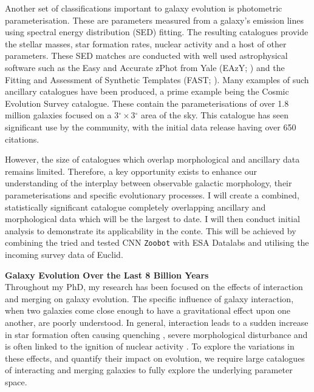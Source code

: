 \documentclass[11pt]{article}
\begin{document}
Another set of classifications important to galaxy evolution is photometric parameterisation. These are parameters measured from a galaxy's emission lines using spectral energy distribution (SED) fitting. The resulting catalogues provide the stellar masses, star formation rates, nuclear activity and a host of other parameters. These SED matches are conducted with well used astrophysical software such as the Easy and Accurate zPhot from Yale (EAzY; \citet{2008ApJ...686.1503B}) and the Fitting and Assessment of Synthetic Templates (FAST; \citet{2009ApJ...700..221K}). Many examples of such ancillary catalogues have been produced, a prime example being the Cosmic Evolution Survey \citep[COSMOS; ][]{2007ApJS..172...99C} catalogue. These contain the parameterisations of over 1.8 million galaxies focused on a 3$^{\circ} \times $3$^{\circ}$ area of the sky. This catalogue has seen significant use by the community, with the initial data release having over 650 citations.

However, the size of catalogues which overlap morphological and ancillary data remains limited. Therefore, a key opportunity exists to enhance our understanding of the interplay between observable galactic morphology, their parameterisations and specific evolutionary processes. I will create a combined, statistically significant catalogue completely overlapping ancillary and morphological data which will be the largest to date. I will then conduct initial analysis to demonstrate its applicability in the conte. This will be achieved by combining the tried and tested CNN \texttt{Zoobot} with ESA Datalabs and utilising the incoming survey data of Euclid.

\vspace{-5mm}
\impact
\vspace{-3mm}
\noindent \textbf{Galaxy Evolution Over the Last 8 Billion Years} \\
\noindent Throughout my PhD, my research has been focused on the effects of interaction and merging on galaxy evolution. The specific influence of galaxy interaction, when two galaxies come close enough to have a gravitational effect upon one another, are poorly understood. In general, interaction leads to a sudden increase in star formation \citep{2021MNRAS.503.3113M} often causing quenching \citep{2023RAA....23b5016D}, severe morphological disturbance \citep{1972ApJ...178..623T} and is often linked to the ignition of nuclear activity \citep{2015ApJ...806..219C}. To explore the variations in these effects, and quantify their impact on evolution, we require large catalogues of interacting and merging galaxies to fully explore the underlying parameter space.
\end{document}
